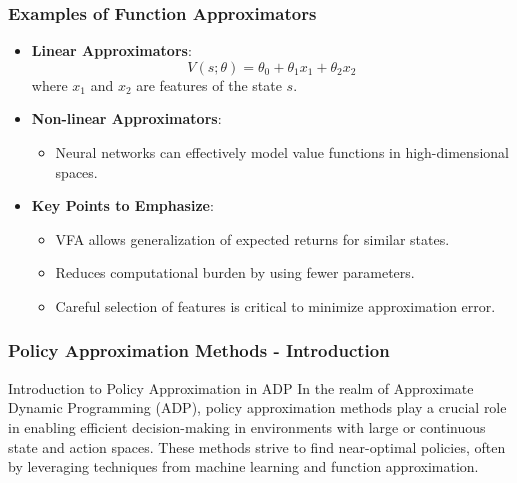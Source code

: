 \documentclass[aspectratio=169]{beamer}
\begin{document}
\begin{frame}[fragile]
    \frametitle{Examples of Function Approximators}
    \begin{itemize}
        \item \textbf{Linear Approximators}:
        \begin{equation}
        V(s; \theta) = \theta_0 + \theta_1 x_1 + \theta_2 x_2
        \end{equation}
        where \( x_1 \) and \( x_2 \) are features of the state \( s \).

        \item \textbf{Non-linear Approximators}:
        \begin{itemize}
            \item Neural networks can effectively model value functions in high-dimensional spaces.
        \end{itemize}

        \item \textbf{Key Points to Emphasize}:
        \begin{itemize}
            \item VFA allows generalization of expected returns for similar states.
            \item Reduces computational burden by using fewer parameters.
            \item Careful selection of features is critical to minimize approximation error.
        \end{itemize}
    \end{itemize}
\end{frame}

\begin{frame}[fragile]
    \frametitle{Policy Approximation Methods - Introduction}
    \begin{block}{Introduction to Policy Approximation in ADP}
        In the realm of Approximate Dynamic Programming (ADP), policy approximation methods play a crucial role in enabling efficient decision-making in environments with large or continuous state and action spaces.
        These methods strive to find near-optimal policies, often by leveraging techniques from machine learning and function approximation.
    \end{block}
\end{frame}
\end{document}
